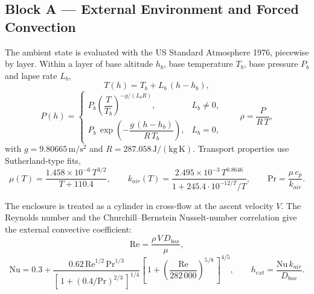 \documentclass[11pt,a4paper]{article}
\newcommand{\unit}[1]{\,\mathrm{#1}}
\begin{document}
\subsection{Block A --- External Environment and Forced Convection}
The ambient state is evaluated with the US Standard Atmosphere 1976, piecewise by
layer. Within a layer of base altitude $h_b$, base temperature $T_b$, base pressure
$P_b$ and lapse rate $L_b$,
\begin{equation}
T(h) = T_b + L_b\,(h-h_b),
\end{equation}
\begin{equation}
P(h) =
\begin{cases}
P_b\left(\dfrac{T}{T_b}\right)^{-g/(L_b R)}, & L_b \neq 0,\\[3mm]
P_b\,\exp\!\left(-\dfrac{g\,(h-h_b)}{R\,T_b}\right), & L_b = 0,
\end{cases}
\qquad
\rho = \frac{P}{R\,T},
\end{equation}
with $g=9.80665\unit{m/s^2}$ and $R=287.058\unit{J/(kg\,K)}$. Transport properties use
Sutherland-type fits,
\begin{equation}
\mu(T) = \frac{1.458\times10^{-6}\,T^{3/2}}{T+110.4},
\qquad
k_{air}(T) = \frac{2.495\times10^{-3}\,T^{0.8646}}{1 + 245.4\cdot 10^{-12/T}/T},
\qquad
\mathrm{Pr} = \frac{\mu\,c_p}{k_{air}}.
\end{equation}

The enclosure is treated as a cylinder in cross-flow at the ascent velocity $V$. The
Reynolds number and the Churchill--Bernstein Nusselt-number correlation give the
external convective coefficient:
\begin{equation}
\mathrm{Re} = \frac{\rho\,V\,D_{box}}{\mu},
\end{equation}
\begin{equation}
\mathrm{Nu} = 0.3 +
\frac{0.62\,\mathrm{Re}^{1/2}\,\mathrm{Pr}^{1/3}}
{\left[\,1+(0.4/\mathrm{Pr})^{2/3}\,\right]^{1/4}}
\left[\,1+\left(\frac{\mathrm{Re}}{282\,000}\right)^{5/8}\,\right]^{4/5},
\qquad
h_{ext} = \frac{\mathrm{Nu}\,k_{air}}{D_{box}}.
\end{equation}

\end{document}
